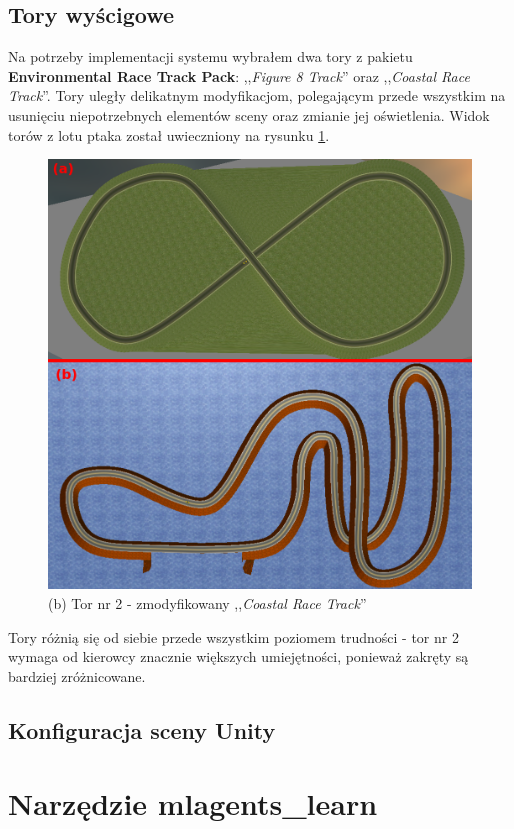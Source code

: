\newpage
\subsection{Tory wyścigowe}
\label{RaceTracksSection}
Na potrzeby implementacji systemu wybrałem dwa tory z pakietu \textbf{Environmental Race Track Pack}: ,,\textit{Figure 8 Track}'' oraz ,,\textit{Coastal Race Track}''. Tory uległy delikatnym modyfikacjom, polegającym przede wszystkim na usunięciu niepotrzebnych elementów sceny oraz zmianie jej oświetlenia. Widok torów z lotu ptaka został uwieczniony na rysunku \ref{RaceTracksFig}. \\

\begin{figure}[h]
\begin{center}
\includegraphics[width=14.5cm]{resources/figures/race_tracks_marked.png}
\caption{Tory wyścigowe wykorzystane w projekcie.}
\vspace*{-0.3cm}
\caption*{(a) Tor nr 1 - zmodyfikowany ,,\textit{Figure 8 Track}''}
\vspace*{-0.3cm}
\caption*{(b) Tor nr 2 - zmodyfikowany ,,\textit{Coastal Race Track}''}
\label{RaceTracksFig}
\end{center}
\end{figure}

\vspace{-0.5cm}
Tory różnią się od siebie przede wszystkim poziomem trudności - tor nr 2 wymaga od kierowcy znacznie większych umiejętności, ponieważ zakręty są bardziej zróżnicowane.

\subsection{Konfiguracja sceny Unity}
\section{Narzędzie mlagents\_learn}